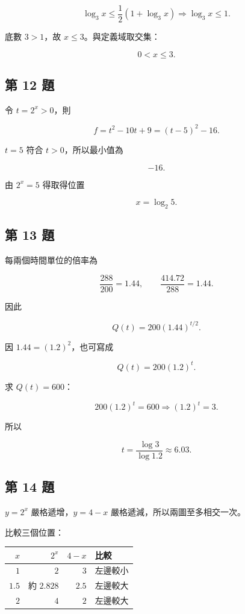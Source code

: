 \documentclass[11pt,a4paper]{article}
\newcounter{none}
\begin{document}
\[
\log_3x\le\frac12(1+\log_3x)
\Longrightarrow
\log_3x\le1.
\]

底數 \(3>1\)，故 \(x\le3\)。與定義域取交集：

\[
\boxed{0<x\le3}.
\]

\subsection{第 12 題}\label{ux7b2c-12-ux984c}

令 \(t=2^x>0\)，則

\[
f=t^2-10t+9=(t-5)^2-16.
\]

\(t=5\) 符合 \(t>0\)，所以最小值為

\[
\boxed{-16}.
\]

由 \(2^x=5\) 得取得位置

\[
\boxed{x=\log_2 5}.
\]

\subsection{第 13 題}\label{ux7b2c-13-ux984c}

每兩個時間單位的倍率為

\[
\frac{288}{200}=1.44,
\qquad
\frac{414.72}{288}=1.44.
\]

因此

\[
Q(t)=200(1.44)^{t/2}.
\]

因 \(1.44=(1.2)^2\)，也可寫成

\[
\boxed{Q(t)=200(1.2)^t}.
\]

求 \(Q(t)=600\)：

\[
200(1.2)^t=600
\Longrightarrow
(1.2)^t=3.
\]

所以

\[
t=\frac{\log3}{\log1.2}
\approx\boxed{6.03}.
\]

\subsection{第 14 題}\label{ux7b2c-14-ux984c}

\(y=2^x\) 嚴格遞增，\(y=4-x\) 嚴格遞減，所以兩圖至多相交一次。

比較三個位置：

{\def\LTcaptype{none} %
\begin{longtable}[]{@{}rrrl@{}}
\toprule\noalign{}
\(x\) & \(2^x\) & \(4-x\) & 比較 \\
\midrule\noalign{}
\endhead
\bottomrule\noalign{}
\endlastfoot
\(1\) & \(2\) & \(3\) & 左邊較小 \\
\(1.5\) & 約 \(2.828\) & \(2.5\) & 左邊較大 \\
\(2\) & \(4\) & \(2\) & 左邊較大 \\
\end{longtable}
}
\end{document}
